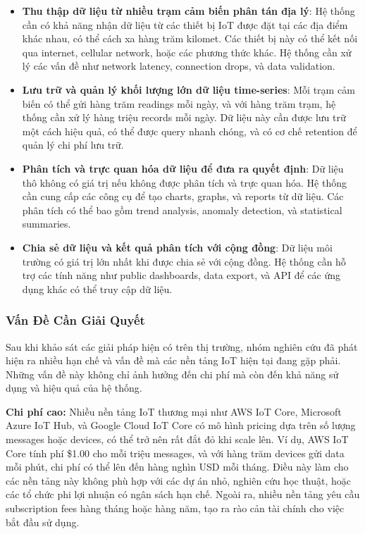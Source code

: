 \begin{itemize}
    \item \textbf{Thu thập dữ liệu từ nhiều trạm cảm biến phân tán địa lý}: Hệ thống cần có khả năng nhận dữ liệu từ các thiết bị IoT được đặt tại các địa điểm khác nhau, có thể cách xa hàng trăm kilomet. Các thiết bị này có thể kết nối qua internet, cellular network, hoặc các phương thức khác. Hệ thống cần xử lý các vấn đề như network latency, connection drops, và data validation.
    
    \item \textbf{Lưu trữ và quản lý khối lượng lớn dữ liệu time-series}: Mỗi trạm cảm biến có thể gửi hàng trăm readings mỗi ngày, và với hàng trăm trạm, hệ thống cần xử lý hàng triệu records mỗi ngày. Dữ liệu này cần được lưu trữ một cách hiệu quả, có thể được query nhanh chóng, và có cơ chế retention để quản lý chi phí lưu trữ.
    
    \item \textbf{Phân tích và trực quan hóa dữ liệu để đưa ra quyết định}: Dữ liệu thô không có giá trị nếu không được phân tích và trực quan hóa. Hệ thống cần cung cấp các công cụ để tạo charts, graphs, và reports từ dữ liệu. Các phân tích có thể bao gồm trend analysis, anomaly detection, và statistical summaries.
    
    \item \textbf{Chia sẻ dữ liệu và kết quả phân tích với cộng đồng}: Dữ liệu môi trường có giá trị lớn nhất khi được chia sẻ với cộng đồng. Hệ thống cần hỗ trợ các tính năng như public dashboards, data export, và API để các ứng dụng khác có thể truy cập dữ liệu.
\end{itemize}

\subsubsection{Vấn Đề Cần Giải Quyết}

Sau khi khảo sát các giải pháp hiện có trên thị trường, nhóm nghiên cứu đã phát hiện ra nhiều hạn chế và vấn đề mà các nền tảng IoT hiện tại đang gặp phải. Những vấn đề này không chỉ ảnh hưởng đến chi phí mà còn đến khả năng sử dụng và hiệu quả của hệ thống.

\textbf{Chi phí cao:} Nhiều nền tảng IoT thương mại như AWS IoT Core, Microsoft Azure IoT Hub, và Google Cloud IoT Core có mô hình pricing dựa trên số lượng messages hoặc devices, có thể trở nên rất đắt đỏ khi scale lên. Ví dụ, AWS IoT Core tính phí \$1.00 cho mỗi triệu messages, và với hàng trăm devices gửi data mỗi phút, chi phí có thể lên đến hàng nghìn USD mỗi tháng. Điều này làm cho các nền tảng này không phù hợp với các dự án nhỏ, nghiên cứu học thuật, hoặc các tổ chức phi lợi nhuận có ngân sách hạn chế. Ngoài ra, nhiều nền tảng yêu cầu subscription fees hàng tháng hoặc hàng năm, tạo ra rào cản tài chính cho việc bắt đầu sử dụng.

